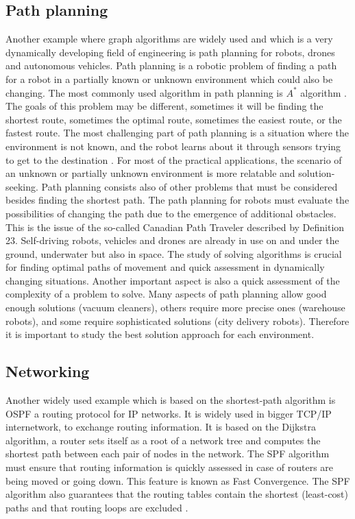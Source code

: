 \subsection{Path planning}
Another example where graph algorithms are widely used and which is a very dynamically developing field of engineering is path planning for robots, drones 
and autonomous vehicles. Path planning is a robotic problem of finding a path for a robot in a partially known or unknown environment which could also be changing. The most 
commonly used algorithm in path planning is $A^*$ algorithm \cite{3}. The goals of this problem may be different, sometimes it will be finding the shortest route, 
sometimes the optimal route, sometimes the easiest route, or the fastest route. The most challenging part of path planning is a situation where the environment is not known, 
and the robot learns about it through sensors trying to get to the destination \cite{20}. For most of the practical applications, the scenario of an unknown or
partially unknown environment is more relatable and solution-seeking. Path planning consists also of other problems that must be considered besides finding the shortest path.
The path planning for robots must evaluate the possibilities of changing the path due to the emergence of additional obstacles. This is the issue of the so-called Canadian Path Traveler
described by Definition 23. Self-driving robots, vehicles and drones are already in use on and under the ground, underwater but also in space. The study of solving algorithms
is crucial for finding optimal paths of movement and quick assessment in dynamically changing situations. Another important aspect is also a quick assessment of the
complexity of a problem to solve. Many aspects of path planning allow good enough solutions (vacuum cleaners), others require more precise ones (warehouse robots), and some require 
sophisticated solutions (city delivery robots)\cite{22}. Therefore it is important to study the best solution approach for each environment.
\subsection{Networking}
Another widely used example which is based on the shortest-path algorithm is OSPF a routing protocol for  IP networks. It is widely used in bigger TCP/IP internetwork, 
to exchange routing information. It is based on the Dijkstra algorithm, a router sets itself as a root of a network tree and computes the shortest path between each pair 
of nodes in the network. The SPF algorithm must ensure that routing information is quickly assessed in case of routers are being moved or going down. 
This feature is known as Fast Convergence. The SPF algorithm also guarantees that the routing tables contain the shortest (least-cost) paths and that routing loops are excluded \cite{23}.

